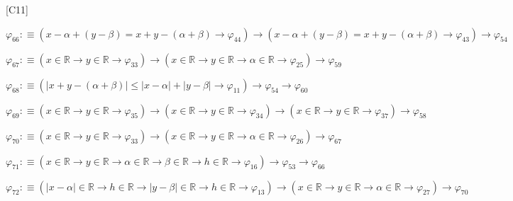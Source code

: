 \begin{fullproof}{[C11]}
\begin{abbrevlist}
\item $\varphi_{66} :\equiv (x - \alpha + (y - \beta) = x + y - (\alpha + \beta) \to \varphi_{44}) \to (x - \alpha + (y - \beta) = x + y - (\alpha + \beta) \to \varphi_{43}) \to \varphi_{54}$
\item $\varphi_{67} :\equiv (x \in \mathbb{R} \to y \in \mathbb{R} \to \varphi_{33}) \to (x \in \mathbb{R} \to y \in \mathbb{R} \to \alpha \in \mathbb{R} \to \varphi_{25}) \to \varphi_{59}$
\item $\varphi_{68} :\equiv (\lvert x + y - (\alpha + \beta) \rvert \leq \lvert x - \alpha \rvert + \lvert y - \beta \rvert \to \varphi_{11}) \to \varphi_{54} \to \varphi_{60}$
\item $\varphi_{69} :\equiv (x \in \mathbb{R} \to y \in \mathbb{R} \to \varphi_{35}) \to (x \in \mathbb{R} \to y \in \mathbb{R} \to \varphi_{34}) \to (x \in \mathbb{R} \to y \in \mathbb{R} \to \varphi_{37}) \to \varphi_{58}$
\item $\varphi_{70} :\equiv (x \in \mathbb{R} \to y \in \mathbb{R} \to \varphi_{33}) \to (x \in \mathbb{R} \to y \in \mathbb{R} \to \alpha \in \mathbb{R} \to \varphi_{26}) \to \varphi_{67}$
\item $\varphi_{71} :\equiv (x \in \mathbb{R} \to y \in \mathbb{R} \to \alpha \in \mathbb{R} \to \beta \in \mathbb{R} \to h \in \mathbb{R} \to \varphi_{16}) \to \varphi_{53} \to \varphi_{66}$
\item $\varphi_{72} :\equiv (\lvert x - \alpha \rvert \in \mathbb{R} \to h \in \mathbb{R} \to \lvert y - \beta \rvert \in \mathbb{R} \to h \in \mathbb{R} \to \varphi_{13}) \to (x \in \mathbb{R} \to y \in \mathbb{R} \to \alpha \in \mathbb{R} \to \varphi_{27}) \to \varphi_{70}$
\end{abbrevlist}
\end{fullproof}
